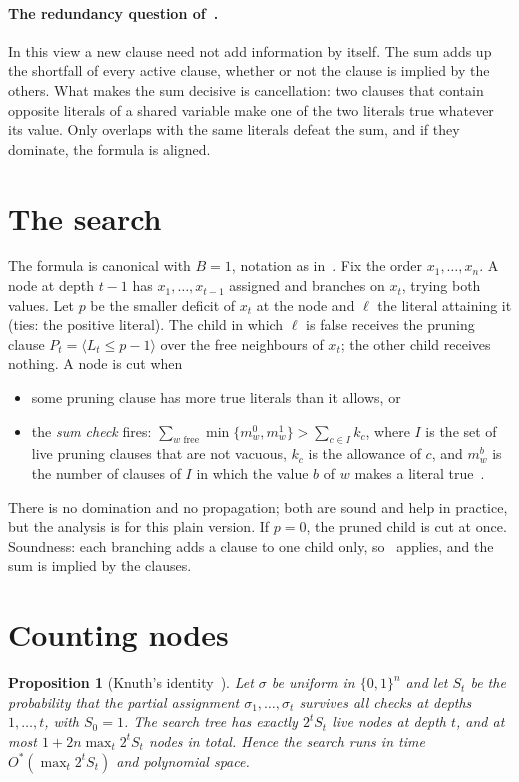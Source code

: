 \documentclass[11pt,a4paper]{article}
\newtheorem{proposition}[theorem]{Proposition}
\theoremstyle{definition}
\theoremstyle{remark}
\newcommand{\Ostar}{O^{*}}
\begin{document}
\paragraph{The redundancy question of~\cite{N6}.} In this view a new clause
need not add information by itself. The sum adds up the shortfall of every
active clause, whether or not the clause is implied by the others. What makes
the sum decisive is cancellation: two clauses that contain opposite literals
of a shared variable make one of the two literals true whatever its value.
Only overlaps with the same literals defeat the sum, and if they dominate, the
formula is aligned.

\section{The search}\label{sec:search}

The formula is canonical with $B=1$, notation as in~\cite[Section~2]{N3}. Fix
the order $x_1,\dots,x_n$. A node at depth $t-1$ has $x_1,\dots,x_{t-1}$
assigned and branches on $x_t$, trying both values. Let $p$ be the smaller
deficit of $x_t$ at the node and $\ell$ the literal attaining it (ties: the
positive literal). The child in which $\ell$ is false receives the pruning
clause $P_t=\langle L_t\le p-1\rangle$ over the free neighbours of $x_t$; the
other child receives nothing. A node is cut when
\begin{itemize}
 \item some pruning clause has more true literals than it allows, or
 \item the \emph{sum check} fires: $\sum_{w\text{ free}}\min\{m^0_w,m^1_w\}
 >\sum_{c\in I}k_c$, where $I$ is the set of live pruning clauses that are not
 vacuous, $k_c$ is the allowance of $c$, and $m^b_w$ is the number of clauses
 of $I$ in which the value $b$ of $w$ makes a literal true~\cite[Section~5]{N4}.
\end{itemize}
There is no domination and no propagation; both are sound and help in
practice, but the analysis is for this plain version. If $p=0$, the pruned
child is cut at once. Soundness: each branching adds a clause to one child
only, so~\cite[Proposition~20]{N3} applies, and the sum is implied by the
clauses.

\section{Counting nodes}\label{sec:count}

\begin{proposition}[Knuth's identity~\cite{Knu75}]\label{prop:knuth}
Let $\sigma$ be uniform in $\{0,1\}^n$ and let $S_t$ be the probability that
the partial assignment $\sigma_1,\dots,\sigma_t$ survives all checks at depths
$1,\dots,t$, with $S_0=1$. The search tree has exactly $2^tS_t$ live nodes at
depth $t$, and at most $1+2n\max_t2^tS_t$ nodes in total. Hence the search runs
in time $\Ostar(\max_t2^tS_t)$ and polynomial space.
\end{proposition}
\end{document}
